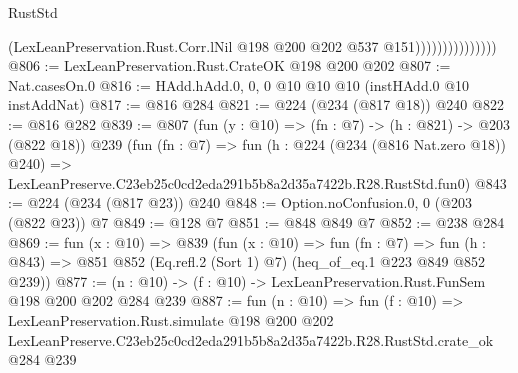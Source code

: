\begin{lexlean}{RustStd}
\begin{coremodule}
                                (LexLeanPreservation.Rust.Corr.lNil
                                  @198
                                  @200
                                  @202
                                  @537
                                  @151)))))))))))))))
@806 := LexLeanPreservation.Rust.CrateOK @198 @200 @202
@807 := Nat.casesOn.{0}
@816 := HAdd.hAdd.{0, 0, 0} @10 @10 @10 (instHAdd.{0} @10 instAddNat)
@817 := @816 @284
@821 := @224 (@234 (@817 @18)) @240
@822 := @816 @282
@839 := @807
    (fun (y : @10) => (fn : @7) -> (h : @821) -> @203 (@822 @18))
    @239
    (fun (fn : @7) =>
    fun (h : @224 (@234 (@816 Nat.zero @18)) @240) =>
    LexLeanPreserve.C23eb25c0cd2eda291b5b8a2d35a7422b.R28.RustStd.fun0)
@843 := @224 (@234 (@817 @23)) @240
@848 := Option.noConfusion.{0, 0} (@203 (@822 @23)) @7
@849 := @128 @7
@851 := @848 @849 @7
@852 := @238 @284
@869 := fun (x : @10) =>
  @839
    (fun (x : @10) =>
    fun (fn : @7) =>
    fun (h : @843) => @851 @852 (Eq.refl.{2} (Sort 1) @7) (heq_of_eq.{1} @223 @849 @852 @239))
@877 := (n : @10) -> (f : @10) -> LexLeanPreservation.Rust.FunSem @198 @200 @202 @284 @239
@887 := fun (n : @10) =>
  fun (f : @10) =>
  LexLeanPreservation.Rust.simulate
    @198
    @200
    @202
    LexLeanPreserve.C23eb25c0cd2eda291b5b8a2d35a7422b.R28.RustStd.crate_ok
    @284
    @239
\end{coremodule}
\end{lexlean}
